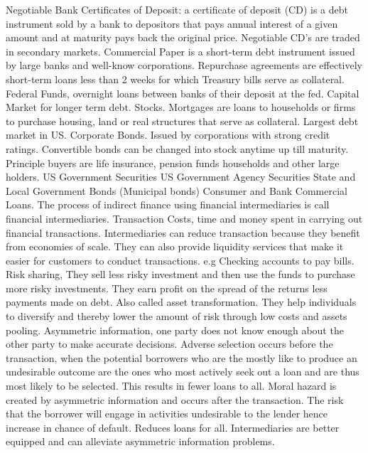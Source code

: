 \documentclass[12pt]{examnotes}
\begin{document}
Negotiable Bank Certificates of Deposit: a certificate of deposit (CD) is a debt instrument sold by a bank to depositors that pays annual interest of a given amount and at maturity pays back the original price. Negotiable CD’s are traded in secondary markets. 
Commercial Paper is a short-term debt instrument issued by large banks and well-know corporations.
Repurchase agreements are effectively short-term loans less than 2 weeks for which Treasury bills serve as collateral.
Federal Funds, overnight loans between banks of their deposit at the fed.
Capital Market for longer term debt. Stocks. 
Mortgages are loans to households or firms to purchase housing, land or real structures that serve as collateral. Largest debt market in US.
Corporate Bonds. Issued by corporations with strong credit ratings. Convertible bonds can be changed into stock anytime up till maturity. Principle buyers are life insurance, pension funds households and other large holders.
US Government Securities
US Government Agency Securities
State and Local Government Bonds (Municipal bonds)
Consumer and Bank Commercial Loans.
The process of indirect finance using financial intermediaries is call financial intermediaries.
Transaction Costs, time and money spent in carrying out financial transactions.  Intermediaries can reduce transaction because they benefit from economies of scale. They can also provide liquidity services that make it easier for customers to conduct transactions. e.g Checking accounts to pay bills.
Risk sharing, They sell less risky investment and then use the funds to purchase more risky investments. They earn profit on the spread of the returns less payments made on debt. Also called asset transformation. They help individuals to diversify and thereby lower the amount of risk through low costs and assets pooling.
Asymmetric information, one party does not know enough about the other party to make accurate decisions.
Adverse selection occurs before the transaction, when the potential borrowers who are the mostly like to produce an undesirable outcome are the ones who most actively seek out a loan and are thus most likely to be selected. This results in fewer loans to all.
Moral hazard is created by asymmetric information and occurs after the transaction. The risk that the borrower will engage in activities undesirable to the lender hence increase in chance of default. Reduces loans for all.
Intermediaries are better equipped and can alleviate asymmetric information problems. 
\end{document}

